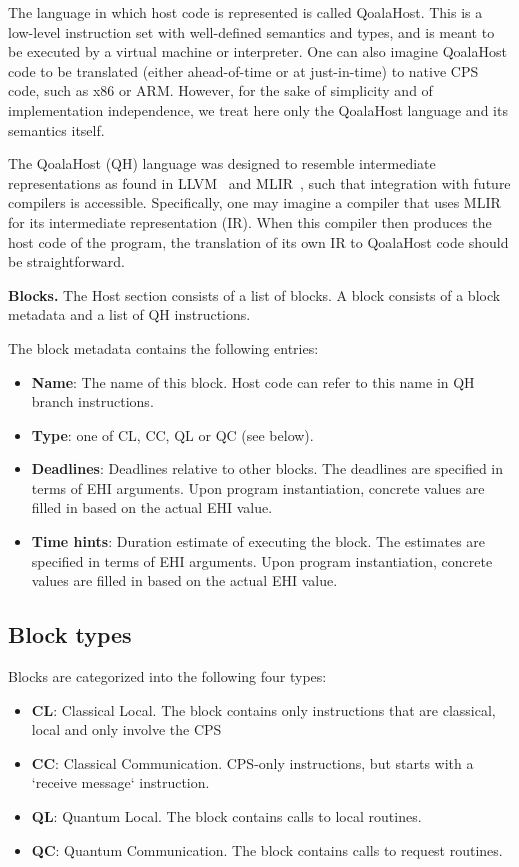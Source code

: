 The language in which host code is represented is called QoalaHost.
This is a low-level instruction set with well-defined semantics and types,
and is meant to be executed by a virtual machine or interpreter.
One can also imagine QoalaHost code to be translated (either ahead-of-time or at just-in-time) to native CPS code, such as x86 or ARM. However, for the sake of simplicity and of implementation independence, we treat here only the QoalaHost language and its semantics itself.

The QoalaHost (QH) language was designed to resemble intermediate representations as found in LLVM~\cite{lattner2004llvm} and MLIR~\cite{lattner2021mlir},
such that integration with future compilers is accessible.
Specifically, one may imagine a compiler that uses MLIR for its intermediate representation (IR).
When this compiler then produces the host code of the program, the translation of its own IR to QoalaHost code should be straightforward.

\textbf{Blocks.} 
The Host section consists of a list of blocks.
A block consists of a block metadata and a list of QH instructions.

The block metadata contains the following entries:
\begin{itemize}
\item \textbf{Name}: The name of this block. Host code can refer to this name in QH branch instructions.
\item \textbf{Type}: one of CL, CC, QL or QC (see below).
\item \textbf{Deadlines}: Deadlines relative to other blocks.
The deadlines are specified in terms of EHI arguments. Upon program instantiation, concrete values are filled in based on the actual EHI value.
\item \textbf{Time hints}: Duration estimate of executing the block.
The estimates are specified in terms of EHI arguments. Upon program instantiation, concrete values are filled in based on the actual EHI value.
\end{itemize}


\subsection{Block types}
Blocks are categorized into the following four types:
\begin{itemize}
\item \textbf{CL}: Classical Local. The block contains only instructions that are classical, local and only involve the CPS
\item \textbf{CC}: Classical Communication. CPS-only instructions, but starts with a `receive message` instruction.
\item \textbf{QL}: Quantum Local. The block contains calls to local routines.
\item \textbf{QC}: Quantum Communication. The block contains calls to request routines.
\end{itemize}


